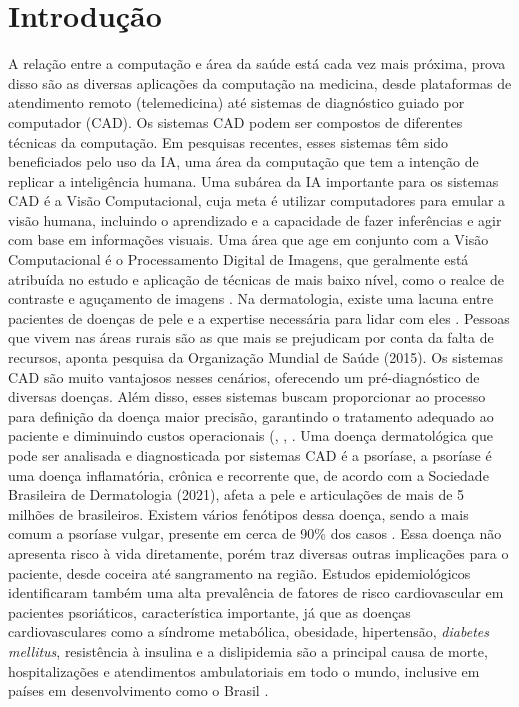 \section{Introdução}
A relação entre a computação e área da saúde está cada vez mais próxima, prova disso são as diversas aplicações da computação na medicina, desde plataformas de atendimento remoto (telemedicina) até sistemas de diagnóstico guiado por computador (\ac{CAD}).
Os sistemas \acs{CAD} podem ser compostos de diferentes técnicas da computação. Em pesquisas recentes, esses sistemas têm sido beneficiados pelo uso da \ac{IA}, uma área da computação que tem a intenção de replicar a inteligência humana. Uma subárea da \acs{IA} importante para os sistemas \acs{CAD} é a Visão Computacional, cuja meta é utilizar computadores para emular a visão humana, incluindo o aprendizado e a capacidade de fazer inferências e agir com base em informações visuais. Uma área que age em conjunto com a Visão Computacional é o Processamento Digital de Imagens, que geralmente está atribuída no estudo e aplicação de técnicas de mais baixo nível, como o realce de contraste e aguçamento de imagens \cite{gonzalez2008digital}.
Na dermatologia, existe uma lacuna entre pacientes de doenças de pele e a expertise necessária para lidar com eles \cite{Hameed2019}. Pessoas que vivem nas áreas rurais são as que mais se prejudicam por conta da falta de recursos, aponta pesquisa da Organização Mundial de Saúde (2015). Os sistemas \acs{CAD} são muito vantajosos nesses cenários, oferecendo um pré-diagnóstico de diversas doenças. Além disso, esses sistemas buscam proporcionar ao processo para definição da doença maior precisão, garantindo o tratamento adequado ao paciente e diminuindo custos operacionais (\cite{Hameed2019}, \cite{DAS2020119556}, \cite{Arora2021}. Uma doença dermatológica que pode ser analisada e diagnosticada por sistemas \acs{CAD} é a psoríase, a psoríase é uma doença inflamatória, crônica e recorrente que, de acordo com a Sociedade Brasileira de Dermatologia (2021), afeta a pele e articulações de mais de 5 milhões de brasileiros. Existem vários fenótipos dessa doença, sendo a mais comum a psoríase vulgar, presente em cerca de 90\% dos casos \cite{Griffiths2007}. Essa doença não apresenta risco à vida diretamente, porém traz diversas outras implicações para o paciente, desde coceira até sangramento na região. Estudos epidemiológicos identificaram também uma alta prevalência de fatores de risco cardiovascular em pacientes psoriáticos, característica importante, já que as doenças cardiovasculares como a síndrome metabólica, obesidade, hipertensão, \textit{diabetes mellitus}, resistência à insulina e a dislipidemia \cite{Miller2013} são a principal causa de morte, hospitalizações e atendimentos ambulatoriais em todo o mundo, inclusive em países em desenvolvimento como o Brasil \cite{Barroso2021}. 
